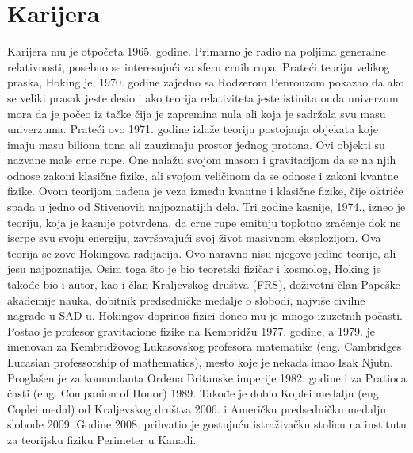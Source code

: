 \documentclass[a4paper, 12pt]{article}
\begin{document}
{\section{Karijera}
Karijera mu je otpočeta 1965. godine. Primarno je radio na poljima generalne relativnosti, posebno se interesujući za sferu crnih rupa. Prateći teoriju velikog praska, Hoking je, 1970. godine zajedno sa Rodzerom Penrouzom pokazao da ako se veliki prasak jeste desio i ako teorija relativiteta jeste istinita onda univerzum mora da je počeo iz tačke čija je zapremina nula ali koja je sadržala svu masu univerzuma. Prateći ovo 1971. godine izlaže teoriju postojanja objekata koje imaju masu biliona tona ali zauzimaju prostor jednog protona. Ovi objekti su nazvane male crne rupe. One nalažu svojom masom i gravitacijom da se na njih odnose zakoni klasične fizike, ali svojom veličinom da se odnose i zakoni kvantne fizike. Ovom teorijom nađena je veza između kvantne i klasične fizike, čije oktriće spada u jedno od Stivenovih najpoznatijih dela. Tri godine kasnije, 1974., izneo je teoriju, koja je kasnije potvrđena, da crne rupe emituju toplotno zračenje dok ne iscrpe svu svoju energiju, završavajući svoj život masivnom eksplozijom. Ova teorija se zove Hokingova radijacija. Ovo naravno nisu njegove jedine teorije, ali jesu najpoznatije.
Osim toga što je bio teoretski fizičar i kosmolog, Hoking je takođe bio i autor, kao i član Kraljevskog društva (FRS), doživotni član Papeške akademije nauka, dobitnik predsedničke medalje o slobodi, najviše civilne nagrade u SAD-u. Hokingov doprinos fizici doneo mu je mnogo izuzetnih počasti. Postao je profesor gravitacione fizike na Kembridžu 1977. godine, a 1979. je imenovan za Kembridžovog Lukasovskog profesora matematike (eng. Cambridges Lucasian professorship of mathematics), mesto koje je nekada imao Isak Njutn. Proglašen je za komandanta Ordena Britanske imperije 1982. godine i za Pratioca časti (eng. Companion of Honor) 1989. Takođe je dobio Koplei medalju (eng. Coplei medal) od Kraljevskog društva 2006. i Američku predsedničku medalju slobode 2009. Godine 2008. prihvatio je gostujuću istraživačku stolicu na institutu za teorijsku fiziku Perimeter u Kanadi.

}
\end{document}
